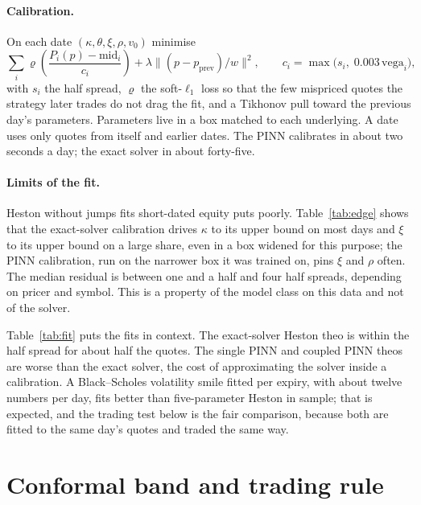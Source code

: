 \documentclass[11pt]{article}
\begin{document}
\paragraph{Calibration.}
On each date $(\kappa,\theta,\xi,\rho,v_0)$ minimise
\begin{equation}
\sum_i \varrho\!\left(\frac{P_i(p)-\mathrm{mid}_i}{c_i}\right)+\lambda\bigl\|(p-p_{\mathrm{prev}})/w\bigr\|^2,\qquad c_i=\max\bigl(s_i,\;0.003\,\mathrm{vega}_i\bigr),
\label{eq:calib}
\end{equation}
with $s_i$ the half spread, $\varrho$ the soft-$\ell_1$ loss so that the few mispriced quotes the strategy later trades do not drag the fit, and a Tikhonov pull toward the previous day's parameters. Parameters live in a box matched to each underlying. A date uses only quotes from itself and earlier dates. The PINN calibrates in about two seconds a day; the exact solver in about forty-five.

\paragraph{Limits of the fit.}
Heston without jumps fits short-dated equity puts poorly. Table~\ref{tab:edge} shows that the exact-solver calibration drives $\kappa$ to its upper bound on most days and $\xi$ to its upper bound on a large share, even in a box widened for this purpose; the PINN calibration, run on the narrower box it was trained on, pins $\xi$ and $\rho$ often. The median residual is between one and a half and four half spreads, depending on pricer and symbol. This is a property of the model class on this data and not of the solver.


Table~\ref{tab:fit} puts the fits in context. The exact-solver Heston theo is within the half spread for about half the quotes. The single PINN and coupled PINN theos are worse than the exact solver, the cost of approximating the solver inside a calibration. A Black--Scholes volatility smile fitted per expiry, with about twelve numbers per day, fits better than five-parameter Heston in sample; that is expected, and the trading test below is the fair comparison, because both are fitted to the same day's quotes and traded the same way.

\section{Conformal band and trading rule}
\end{document}
